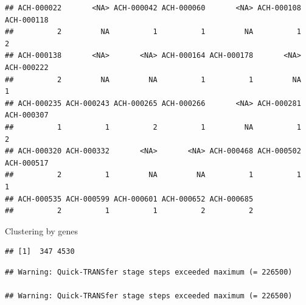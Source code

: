 \documentclass[
]{article}
\begin{document}
\begin{verbatim}
## ACH-000022       <NA> ACH-000042 ACH-000060       <NA> ACH-000108 ACH-000118 
##          2         NA          1          1         NA          1          2 
## ACH-000138       <NA>       <NA> ACH-000164 ACH-000178       <NA> ACH-000222 
##          2         NA         NA          1          1         NA          1 
## ACH-000235 ACH-000243 ACH-000265 ACH-000266       <NA> ACH-000281 ACH-000307 
##          1          1          2          1         NA          1          2 
## ACH-000320 ACH-000332       <NA>       <NA> ACH-000468 ACH-000502 ACH-000517 
##          2          1         NA         NA          1          1          1 
## ACH-000535 ACH-000599 ACH-000601 ACH-000652 ACH-000685 
##          2          1          1          2          2
\end{verbatim}

Clustering by genes

\begin{verbatim}
## [1]  347 4530
\end{verbatim}

\begin{verbatim}
## Warning: Quick-TRANSfer stage steps exceeded maximum (= 226500)

## Warning: Quick-TRANSfer stage steps exceeded maximum (= 226500)
\end{verbatim}
\end{document}
